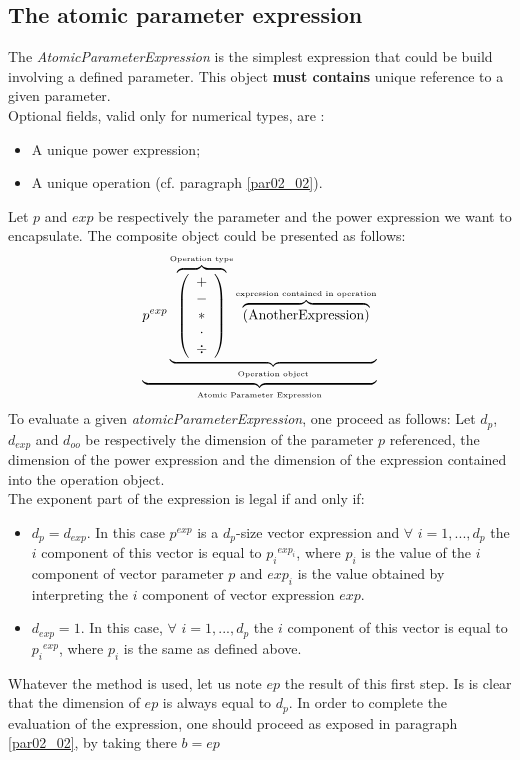 \documentclass[11pt]{amsart}
\begin{document}
\subsection{The atomic parameter expression}\label{par02_01}
The {\it AtomicParameterExpression} is the simplest expression that could be build involving a defined parameter. This object {\bf must contains} unique reference to a given parameter.\\
Optional fields, valid only for numerical types, are : 
\begin{itemize}
\item A unique power expression;
\item A unique operation (cf. paragraph \ref{par02_02}).
\end{itemize}
Let $p$ and $exp$ be respectively the parameter and the power expression we want to encapsulate. The composite object could be presented as follows:
\begin{equation}
 \underbrace{  p^{exp} \underbrace{  \overbrace{\left( \begin{array}{c} + \\ - \\ \ast  \\ \cdot \\ \div   \end{array} \right) }^{\mbox{\tiny Operation type}}
 \overbrace{    \left( \mbox{AnotherExpression}\right) }^{\mbox{\tiny expression contained in operation}}   }_{\mbox{\tiny Operation object}}}_{\mbox{\tiny Atomic Parameter Expression}}
\end{equation}
To evaluate a given {\it atomicParameterExpression}, one proceed as follows: 
Let $d_p$, $d_{exp}$ and $d_{oo}$ be respectively the dimension of the parameter $p$ referenced, the dimension of the power expression and the dimension of the expression contained into the operation object.\\
The exponent part of the expression is legal if and only if:
\begin{itemize}
\item $d_p=d_{exp}$. In this case $p^{exp}$ is a $d_p$-size vector expression and $\forall$ $i=1,...,d_p$ the $i$ component of this vector is equal to ${p_i}^{exp_i}$, where $p_i$ is the value of the $i$ component of vector parameter $p$ and $exp_i$ is the value obtained by interpreting the $i$ component of vector expression $exp$.
\item $d_{exp}=1$. In this case, $\forall$ $i=1,...,d_p$ the $i$ component of this vector is equal to ${p_i}^{exp}$, where $p_i$ is the same as defined above.
\end{itemize} 
Whatever the method is used, let us note $ep$ the result of this first step. Is is clear that the dimension of $ep$ 
is always equal to $d_p$. In order to complete the evaluation of the expression, one should proceed as exposed in paragraph \ref{par02_02}, by taking there $b=ep$
\end{document}

